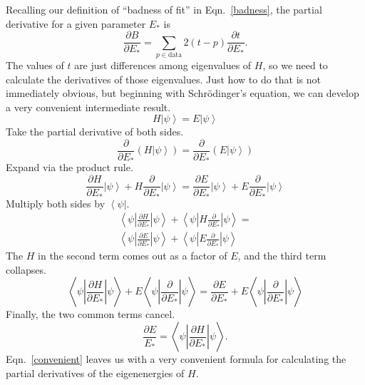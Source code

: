 \documentclass[twocolumn]{revtex4}
\newcommand{\bra}[1]{\left< #1 \right|}
\newcommand{\ket}[1]{\left| #1 \right>}
\newcommand{\innerp}[3]{\textstyle\left< #1 \left| #2 \right| #3 \right>}
\begin{document}
Recalling our definition of ``badness of fit'' in Eqn.~\eqref{badness},
the partial derivative for a given parameter $E_*$ is
\begin{equation}
  \label{partials}
  \frac{\partial B}{\partial E_{*}} =
  \sum_{p \in \text{data}}2(t-p)\frac{\partial t}{\partial E_*}.
\end{equation}
The values of $t$ are just differences among eigenvalues of $H$, so we
need to calculate the derivatives of those eigenvalues. Just how to do
that is not immediately obvious, but beginning with Schr\"odinger's
equation, we can develop a very convenient intermediate result.
\begin{equation}
  H\ket{\psi} = E\ket{\psi}
\end{equation}
Take the partial derivative of both sides.
\begin{equation}
  \frac{\partial}{\partial E_*} (H\ket{\psi}) =
  \frac{\partial}{\partial E_*} (E\ket{\psi})
\end{equation}
Expand via the product rule.
\begin{equation}
  \frac{\partial H}{\partial E_*}\ket{\psi} +
  H\frac{\partial}{\partial E_*}\ket{\psi} =
  \frac{\partial E}{\partial E_*}\ket{\psi} +
  E\frac{\partial}{\partial E_*}\ket{\psi}
\end{equation}
Multiply both sides by $\bra{\psi}$.
\begin{multline}
  \innerp{\psi}{\frac{\partial H}{\partial E_*}}{\psi} +
  \innerp{\psi}{H\frac{\partial}{\partial E_*}}{\psi} =\\
  \innerp{\psi}{\frac{\partial E}{\partial E_*}}{\psi}+
  \innerp{\psi}{E\frac{\partial}{\partial E_*}}{\psi}
\end{multline}
The $H$ in the second term comes out as a factor of $E$, and the third
term collapses.
\begin{equation}
  \innerp{\psi}{\frac{\partial H}{\partial E_*}}{\psi} +
  E\innerp{\psi}{\frac{\partial}{\partial E_*}}{\psi} =
  \frac{\partial E}{\partial E_*} +
  E\innerp{\psi}{\frac{\partial}{\partial E_*}}{\psi}
\end{equation}
Finally, the two common terms cancel.
\begin{equation}
  \frac{\partial E}{E_*} =
  \innerp{\psi}{\frac{\partial H}{\partial E_*}}{\psi}.
  \label{convenient}
\end{equation}
Eqn.~\eqref{convenient} leaves us with a very convenient formula for
calculating the partial derivatives of the eigenenergies of $H$.
\end{document}
